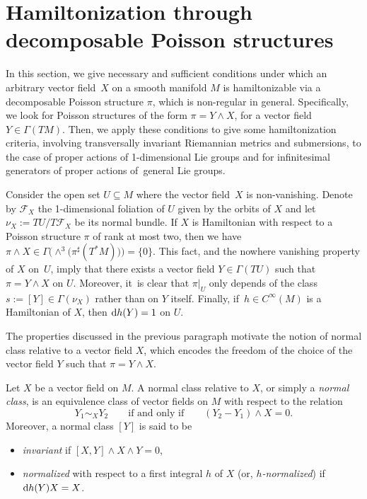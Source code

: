 \documentclass[10pt,a4paper]{amsart}
\newcommand{\dd}{{\rm d}}
\numberwithin{equation}{section}
\begin{document}
\section{Hamiltonization through decomposable Poisson structures}\label{sec:HamGood}

In this section, we give necessary and sufficient conditions under which an arbitrary vector field~$X$ on a smooth manifold $M$ is hamiltonizable via a decomposable Poisson structure $\pi$, which is non-regular in general. Specifically, we look for Poisson structures of the form $\pi = Y \wedge X$, for a vector field $Y \in \Gamma(TM)$. Then, we apply these conditions to give some hamiltonization criteria, involving transversally invariant Riemannian metrics and submersions, to the case of proper actions of 1-dimensional Lie groups and for infinitesimal generators of proper actions of~general Lie groups.

Consider the open set $U \subseteq M$ where the vector field~$X$ is non-vanishing. Denote by $\mathcal{F}_{X}$ the 1-dimensional foliation of $U$ given by the orbits of $X$ and let $\nu_{X} := TU/T\mathcal{F}_{X}$ be its normal bundle. If $X$ is Hamiltonian with respect to a Poisson structure $\pi$ of rank at most two, then we have $\pi \wedge X \in \Gamma\big({\wedge}^{3}\big(\pi^{\sharp}(T^{*}M)\big)\big) = \{0\}$. This fact, and the nowhere vanishing property of $X$ on~$U$, imply that there exists a vector field $Y \in \Gamma(TU)$ such that $\pi = Y \wedge X$ on $U$. Moreover, it~is clear that $\pi|_{U}$ only depends of the class $s := [Y] \in \Gamma(\nu_{X})$ rather than on $Y$ itself. Finally, if~$h \in C^{\infty}(M)$ is a Hamiltonian of $X$, then $\dd h(Y) = 1$ on $U$.

The properties discussed in the previous paragraph motivate the notion of normal class relative to a vector field $X$, which encodes the freedom of the choice of the vector field $Y$ such that $\pi = Y \wedge X$.

\begin{Definition}
Let $X$ be a vector field on $M$. A normal class relative to $X$, or simply a \emph{normal class}, is an equivalence class of vector fields on $M$ with respect to the relation
 \begin{equation*}
 Y_1 \sim_{X} Y_2 \qquad \text{if and only if} \qquad (Y_2 - Y_1) \wedge X = 0.
 \end{equation*}
Moreover, a normal class $[Y]$ is said to be
 \begin{itemize}\itemsep=0pt
 \item \emph{invariant} if $[X,Y] \wedge X \wedge Y=0$,
 \item \emph{normalized} with respect to a first integral $h$ of $X$ (or, \emph{$h$-normalized}) if $\dd h(Y)X=X$.
 \end{itemize}
\end{Definition}
\end{document}
